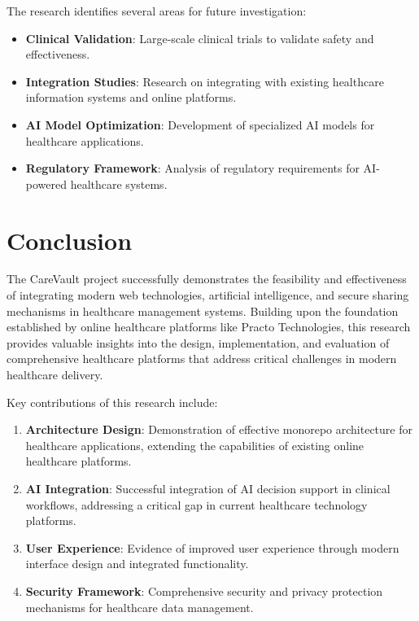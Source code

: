\documentclass[12pt,a4paper]{article}
\begin{document}
The research identifies several areas for future investigation:

\begin{itemize}
    \item \textbf{Clinical Validation}: Large-scale clinical trials to validate safety and effectiveness.
    \item \textbf{Integration Studies}: Research on integrating with existing healthcare information systems and online platforms.
    \item \textbf{AI Model Optimization}: Development of specialized AI models for healthcare applications.
    \item \textbf{Regulatory Framework}: Analysis of regulatory requirements for AI-powered healthcare systems.
\end{itemize}

\section{Conclusion}

The CareVault project successfully demonstrates the feasibility and effectiveness of integrating modern web technologies, artificial intelligence, and secure sharing mechanisms in healthcare management systems. Building upon the foundation established by online healthcare platforms like Practo Technologies, this research provides valuable insights into the design, implementation, and evaluation of comprehensive healthcare platforms that address critical challenges in modern healthcare delivery.

Key contributions of this research include:

\begin{enumerate}
    \item \textbf{Architecture Design}: Demonstration of effective monorepo architecture for healthcare applications, extending the capabilities of existing online healthcare platforms.
    \item \textbf{AI Integration}: Successful integration of AI decision support in clinical workflows, addressing a critical gap in current healthcare technology platforms.
    \item \textbf{User Experience}: Evidence of improved user experience through modern interface design and integrated functionality.
    \item \textbf{Security Framework}: Comprehensive security and privacy protection mechanisms for healthcare data management.
\end{enumerate}
\end{document}
